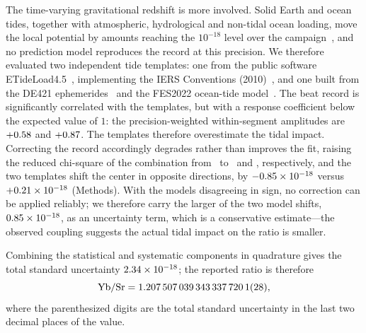 The time-varying gravitational redshift is more involved. Solid Earth
and ocean tides, together with atmospheric, hydrological and
non-tidal ocean loading, move the local potential by amounts reaching
the $10^{-18}$ level over the campaign~\citep{agnew2015tides,
voigt2016timevariable, denker2018geodetic}, and no prediction model
reproduces the record at this precision. We therefore evaluated two
independent tide templates: one from the public software
ETideLoad4.5~\citep{zhang2026etideload}, implementing the IERS
Conventions (2010)~\citep{iers2010conventions}, and one built from
the DE421 ephemerides~\citep{folkner2009de421} and the FES2022
ocean-tide model~\citep{lyard2021fes2014}. The beat record is
significantly correlated with the templates, but with a response
coefficient below the expected value of $1$: the precision-weighted
within-segment amplitudes are $+0.58$ and
$+0.87$. The templates therefore overestimate the
tidal impact. Correcting the record accordingly degrades
rather than improves the fit, raising the reduced chi-square of the
combination from \tidalChiRaw~to \tidalChiEmp~and \tidalChiAlt,
respectively, and the two templates shift the center in opposite
directions, by $-0.85\times10^{-18}$ versus
$+0.21\times10^{-18}$ (Methods). With the models
disagreeing in sign, no correction can be applied reliably; we
therefore carry the larger of the two model shifts,
$0.85\times10^{-18}$, as an uncertainty term, which is a
conservative estimate---the observed coupling suggests the actual
tidal impact on the ratio is smaller.

Combining the statistical and systematic components in quadrature
gives the total standard uncertainty
$2.34\times10^{-18}$; the reported ratio is therefore
\begin{equation}
  \mathrm{Yb/Sr} = 1.207\thinspace507\thinspace039\thinspace343\thinspace337\thinspace720\thinspace1(28),
\end{equation}
where the parenthesized digits are the total standard uncertainty in
the last two decimal places of the value.

